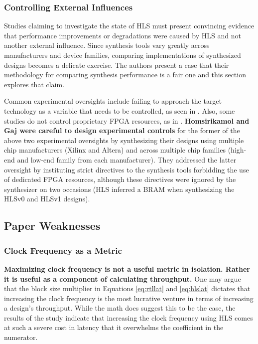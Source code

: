 \documentclass[12pt,journal,compsoc,onecolumn]{IEEEtran}
\begin{document}
\subsubsection{Controlling External Influences}
Studies claiming to investigate the state of HLS must present convincing evidence that performance improvements or degradations were caused by HLS and not another external influence. Since synthesis tools vary greatly across manufacturers and device families, comparing implementations of synthesized designs becomes a delicate exercise. The authors present a case that their methodology for comparing synthesis performance is a fair one and this section explores that claim.

Common experimental oversights include failing to approach the target technology as a variable that needs to be controlled, as seen in \cite{skalicky}. Also, some studies do not control proprietary FPGA resources, as in \cite{10}. \textbf{Homsirikamol and Gaj were careful to design experimental controls} for the former of the above two experimental oversights by synthesizing their designs using multiple chip manufacturers (Xilinx and Altera) and across multiple chip families (high-end and low-end family from each manufacturer). They addressed the latter oversight by instituting strict directives to the synthesis tools forbidding the use of dedicated FPGA resources, although these directives were ignored by the synthesizer on two occasions (HLS inferred a BRAM when synthesizing the HLSv0 and HLSv1 designs).

\subsection{Paper Weaknesses}\label{sec:weaknesses}
\subsubsection{Clock Frequency as a Metric}
\textbf{Maximizing clock frequency is not a useful metric in isolation. Rather it is useful as a component of calculating throughput.} One may argue that the block size multiplier in Equations \ref{eq:rtllat} and \ref{eq:hlslat} dictates that increasing the clock frequency is the most lucrative venture in terms of increasing a design's throughput. While the math does suggest this to be the case, the results of the study indicate that increasing the clock frequency using HLS comes at such a severe cost in latency that it overwhelms the coefficient in the numerator.
\end{document}
